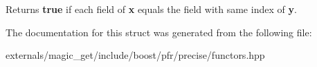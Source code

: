 \begin{DoxyReturn}{Returns}
{\bfseries true} if each field of {\bfseries x} equals the field with same index of {\bfseries y}.
\end{DoxyReturn}


The documentation for this struct was generated from the following file\+:\begin{DoxyCompactItemize}
\item 
externals/magic\+\_\+get/include/boost/pfr/precise/functors.\+hpp\end{DoxyCompactItemize}
